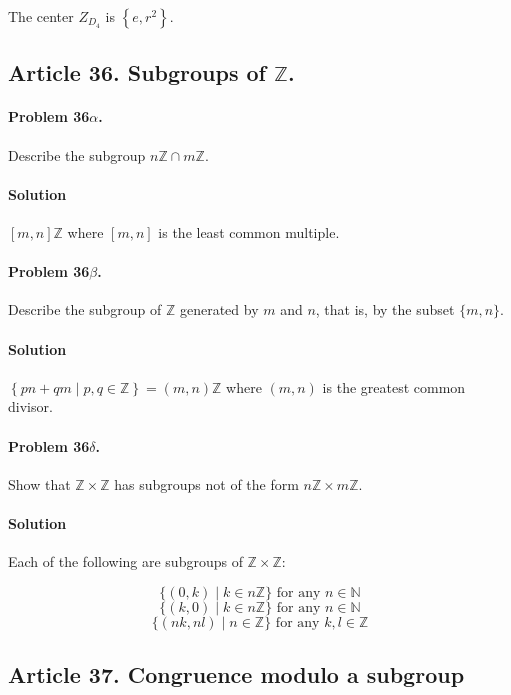 The center $Z_{D_4}$ is $\left\{e, r^2\right\}$.

\subsection{Article 36. Subgroups of $\mathbb{Z}$.}

\paragraph{Problem 36$\alpha$.}
Describe the subgroup $n\mathbb{Z} \cap m\mathbb{Z}$.

\paragraph*{Solution}
$[m,n]\mathbb{Z}$ where $[m,n]$ is the least common multiple.

\paragraph{Problem 36$\beta$.}
Describe the subgroup of $\mathbb{Z}$ generated by $m$ and $n$, that is,
by the subset $\{ m, n\}$.

\paragraph*{Solution}
$\left\{ pn + qm \mid p,q \in \mathbb{Z} \right\} = (m,n)\mathbb{Z}$ where
$(m,n)$ is the greatest common divisor.

\paragraph{Problem 36$\delta$.}
Show that $\mathbb{Z} \times \mathbb{Z}$ has subgroups not of the form
$n\mathbb{Z} \times m\mathbb{Z}$.

\paragraph*{Solution}
Each of the following are subgroups of $\mathbb{Z} \times \mathbb{Z}$:

$$\{ (0, k) \mid k \in n\mathbb{Z} \} \mbox{ for any } n \in \mathbb{N}$$
$$\{ (k, 0) \mid k \in n\mathbb{Z} \} \mbox{ for any } n \in \mathbb{N}$$
$$\{ (nk, nl) \mid n \in \mathbb{Z} \} \mbox{ for any } k, l \in
\mathbb{Z} $$

\subsection{Article 37. Congruence modulo a subgroup}

